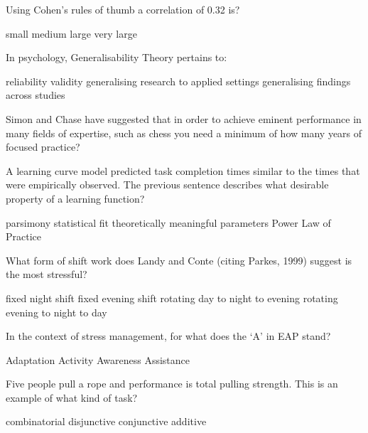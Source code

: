 \documentclass[12pt, a4paper]{exam}\usepackage[]{graphicx}\usepackage[]{color}
\begin{document}
\begin{questions}
\filbreak
\question
 Using Cohen's rules of thumb a correlation of 0.32 is?
\begin{choices}
\choice small
\choice medium
\choice large
\choice very large
\vspace{10 mm}
\end{choices}


\filbreak
\question
 In psychology, Generalisability Theory pertains to:
\begin{choices}
\choice reliability
\choice validity
\choice generalising research to applied settings
\choice generalising findings across studies
\vspace{10 mm}
\end{choices}


\filbreak
\question
 Simon and Chase have suggested that in order to achieve eminent performance in many fields of expertise, such as chess you need a minimum of how many years of focused practice?
\begin{choices}
\vspace{10 mm}
\end{choices}


\filbreak
\question
 A learning curve model predicted task completion times similar to the times that were empirically observed. The previous sentence describes what desirable property of a learning function?
\begin{choices}
\choice parsimony
\choice statistical fit
\choice theoretically meaningful parameters
\choice Power Law of Practice
\vspace{10 mm}
\end{choices}


\filbreak
\question
 What form of shift work does Landy and Conte (citing Parkes, 1999) suggest is the most stressful?
\begin{choices}
\choice fixed night shift
\choice fixed evening shift
\choice rotating day to night to evening
\choice rotating evening to night to day
\vspace{10 mm}
\end{choices}


\filbreak
\question
 In the context of stress management, for what does the `A' in EAP stand?
\begin{choices}
\choice Adaptation
\choice Activity
\choice Awareness
\choice Assistance
\vspace{10 mm}
\end{choices}


\filbreak
\question
 Five people pull a rope and performance is total pulling strength. This is an example of what kind of task?
\begin{choices}
\choice combinatorial
\choice disjunctive
\choice conjunctive
\choice additive
\vspace{10 mm}
\end{choices}



\end{questions}
\end{document}
